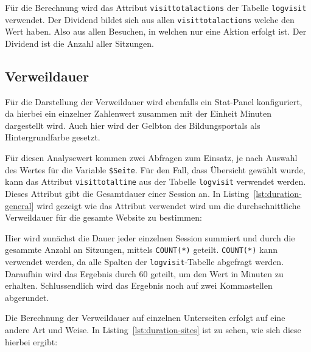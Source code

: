 Für die Berechnung wird das Attribut \texttt{visit\textunderscore total\textunderscore actions} der Tabelle \texttt{log\textunderscore visit} verwendet. Der Dividend bildet sich aus allen \texttt{visit\textunderscore total\textunderscore actions} welche den Wert \grqq{} haben. Also aus allen Besuchen, in welchen nur eine Aktion erfolgt ist. Der Dividend ist die Anzahl aller Sitzungen.

\subsection{Verweildauer}
Für die Darstellung der Verweildauer wird ebenfalls ein Stat-Panel konfiguriert, da hierbei ein einzelner Zahlenwert zusammen mit der Einheit Minuten dargestellt wird. Auch hier wird der Gelbton des Bildungsportals als Hintergrundfarbe gesetzt.

Für diesen Analysewert kommen zwei Abfragen zum Einsatz, je nach Auswahl des Wertes für die Variable \texttt{\$Seite}. Für den Fall, dass \glqq Übersicht\grqq{} gewählt wurde, kann das Attribut \texttt{visit\textunderscore total\textunderscore time} aus der Tabelle \texttt{log\textunderscore visit} verwendet werden. Dieses Attribut gibt die Gesamtdauer einer Session an. In Listing~\ref{lst:duration-general} wird gezeigt wie das Attribut verwendet wird um die durchschnittliche Verweildauer für die gesamte Website zu bestimmen: 

\begin{figure}[H]
    \centering
    \begin{minipage}{\textwidth}
        
    \end{minipage}
\end{figure}

Hier wird zunächst die Dauer jeder einzelnen Session summiert und durch die gesammte Anzahl an Sitzungen, mittels \texttt{COUNT(*)} geteilt. \texttt{COUNT(*)} kann verwendet werden, da alle Spalten der \texttt{log\textunderscore visit}-Tabelle abgefragt werden. Daraufhin wird das Ergebnis durch 60 geteilt, um den Wert in Minuten zu erhalten. Schlussendlich wird das Ergebnis noch auf zwei Kommastellen abgerundet. 

Die Berechnung der Verweildauer auf einzelnen Unterseiten erfolgt auf eine andere Art und Weise. In Listing~\ref{lst:duration-sites} ist zu sehen, wie sich diese hierbei ergibt:

